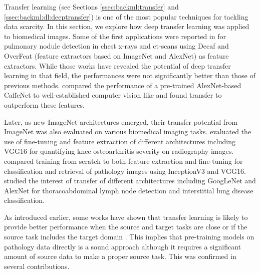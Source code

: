 Transfer learning (see Sections \ref{ssec:backml:transfer} and \ref{ssec:backml:dl:deeptransfer}) is one of the most popular techniques for tackling data scarcity. In this section, we explore how deep transfer learning was applied to biomedical images. Some of the first applications were reported in \cite{bar2015chest,ciompi2015automatic,van2015off} for pulmonary nodule detection in chest x-rays and \acrshort{ct}-scans using Decaf and OverFeat (feature extractors based on ImageNet and AlexNet) as feature extractors. While those works have revealed the potential of deep transfer learning in that field, the performances were not significantly better than those of previous methods. \citeauthor{ravishankar2016understanding} \cite{ravishankar2016understanding} compared the performance of a pre-trained AlexNet-based CaffeNet \cite{jia2014caffe} to well-established computer vision like  \cite{mcconnell1986method} and found transfer to outperform these features.

Later, as new ImageNet architectures emerged, their transfer potential from ImageNet was also evaluated on various biomedical imaging tasks. \citeauthor{antony2016quantifying} \cite{antony2016quantifying} evaluated the use of fine-tuning and feature extraction of different architectures including VGG16 for quantifying knee osteoarthritis severity on radiography images. \citeauthor{kieffer2017convolutional} \cite{kieffer2017convolutional} compared training from scratch to both feature extraction and fine-tuning for classification and retrieval of pathology images using InceptionV3 and VGG16. \citeauthor{shin2016deep} \cite{shin2016deep} studied the interest of transfer of different architectures including GoogLeNet and AlexNet for thoracoabdominal lymph node detection and interstitial lung disease classification. 

As introduced earlier, some works have shown that transfer learning is likely to provide better performance when the source and target tasks are close \cite{yosinski2014transferable} or if the source task includes the target domain \cite{mensink2021factors}. This implies that pre-training models on pathology data directly is a sound approach although it requires a significant amount of source data to make a proper source task. This was confirmed in several contributions.

